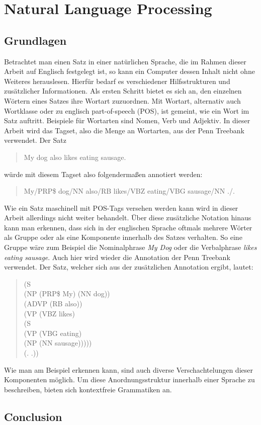 %
\chapter{Natural Language Processing}
\label{sec:nlp}




\section{Grundlagen}
\label{sec:related:grundlagen}

Betrachtet man einen Satz in einer natürlichen Sprache, die im Rahmen dieser Arbeit auf Englisch festgelegt ist, so kann ein Computer dessen Inhalt nicht ohne Weiteres herauslesen. Hierfür bedarf es verschiedener Hilfsstrukturen und zusätzlicher Informationen. Als ersten Schritt bietet es sich an, den einzelnen Wörtern eines Satzes ihre Wortart zuzuordnen. Mit Wortart, alternativ auch Wortklasse oder zu englisch part-of-speech (POS), ist gemeint, wie ein Wort im Satz auftritt. Beispiele für Wortarten sind Nomen, Verb und Adjektiv. In dieser Arbeit wird das Tagset, also die Menge an Wortarten, aus der Penn Treebank verwendet. %
Der Satz
\begin{quote}
My dog also likes eating sausage.
\end{quote}
würde mit diesem Tagset also folgendermaßen annotiert werden:
\begin{quote}
My/PRP\$ dog/NN also/RB likes/VBZ eating/VBG sausage/NN ./.
\end{quote}
Wie ein Satz maschinell mit POS-Tags versehen werden kann wird in dieser Arbeit allerdings nicht weiter behandelt. 
Über diese zusätzliche Notation hinaus kann man erkennen, dass sich in der englischen Sprache oftmals mehrere Wörter als Gruppe oder als eine Komponente innerhalb des Satzes verhalten. So eine Gruppe wäre zum Beispiel die Nominalphrase \textit{My Dog} oder die Verbalphrase \textit{likes eating sausage}. Auch hier wird wieder die Annotation der Penn Treebank verwendet. %
Der Satz, welcher sich aus der zusätzlichen Annotation ergibt, lautet:
\begin{quote}
(S\\
	(NP (PRP\$ My) (NN dog))\\
    (ADVP (RB also))\\
    (VP (VBZ likes)\\
      (S\\
        (VP (VBG eating)\\
          (NP (NN sausage)))))\\
    (. .))
\end{quote}
Wie man am Beispiel erkennen kann, sind auch diverse Verschachtelungen dieser Komponenten möglich. Um diese Anordnungsstruktur innerhalb einer Sprache zu beschreiben, bieten sich kontextfreie Grammatiken an. %


\section{Conclusion}
\label{sec:related:conclusion}
